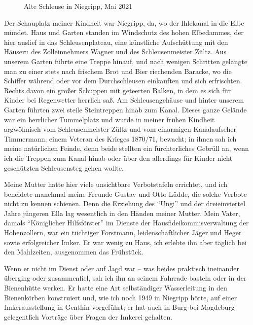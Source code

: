 \documentclass[a5paper,pagesize,10pt,twoside=true]{scrbook}
\begin{document}
\begin{figure}[h]
	\caption{Alte Schleuse in Niegripp, Mai 2021}
	\label{fig:schleuse_niegripp}
\end{figure}

Der Schauplatz meiner Kindheit war Niegripp, da, wo der Ihlekanal in die Elbe mündet. Haus und Garten standen im Windschutz des hohen Elbedammes, der hier auslief in das Schleusenplateau, eine künstliche Aufschüttung mit den Häusern des Zolleinnehmers Wagner und des Schleusenmeister Zültz. Aus unserem Garten führte eine Treppe hinauf, und nach wenigen Schritten gelangte man zu einer stets nach frischem Brot und Bier riechenden Baracke, wo die Schiffer während oder vor dem Durchschleusen einkauften und sich erfrischten. Rechts davon ein großer Schuppen mit geteerten Balken, in dem es sich für Kinder bei Regenwetter herrlich saß. Am Schleusengehäuse und hinter unserem Garten führten zwei steile Steintreppen hinab zum Kanal. Dieses ganze Gelände war ein herrlicher Tummelplatz und wurde in meiner frühen Kindheit argwöhnisch vom Schleusenmeister Zültz und vom einarmigen Kanalaufseher Timmermann, einem Veteran des Krieges 1870/71, bewacht; in ihnen sah ich meine natürlichen Feinde, denn beide stellten ein fürchterliches Gebrüll an, wenn ich die Treppen zum Kanal hinab oder über den allerdings für Kinder nicht geschützten Schleusensteg gehen wollte.

Meine Mutter hatte hier viele unsichtbare Verbotstafeln errichtet, und ich beneidete manchmal meine Freunde Gustav und Otto Lüdde, die solche Verbote nicht zu kennen schienen. Denn die Erziehung des \enquote{Ungi} und der dreieinviertel Jahre jüngeren Ella lag wesentlich in den Händen meiner Mutter. Mein Vater, damals \enquote{Königlicher Hilfsförster} im Dienste der Hausfideikommisverwaltung der Hohenzollern, war ein tüchtiger Forstmann, leidenschaftlicher Jäger und Heger sowie erfolgreicher Imker. Er war wenig zu Haus, ich erlebte ihn aber täglich bei den Mahlzeiten, ausgenommen das Frühstück.

Wenn er nicht im Dienst oder auf Jagd war -- was beides praktisch ineinander überging oder zusammenfiel, sah ich ihn an seinem Fahrrade basteln oder in der Bienenhütte werken. Er hatte eine Art selbständiger Wasserleitung in den Bienenkörben konstruiert und, wie ich noch 1949 in Niegripp hörte, auf einer Imkerausstellung in Genthin vorgeführt; er hat auch in Burg bei Magdeburg gelegentlich Vorträge über Fragen der Imkerei gehalten.
\end{document}
